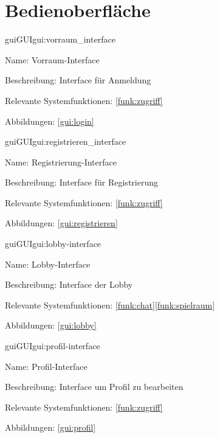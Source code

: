 
\section{Bedienoberfläche}

\setcounter{gui}{10}

\begin{description}[leftmargin=5em, style=sameline]	
	\begin{lhp}{gui}{GUI}{gui:vorraum_interface}
		\item[Name:] Vorraum-Interface
		\item[Beschreibung:] Interface für Anmeldung
		\item[Relevante Systemfunktionen:] \ref{funk:zugriff}
		\item[Abbildungen:] \ref{gui:login}
	\end{lhp}
\end{description}

\begin{description}[leftmargin=5em, style=sameline]	
	\begin{lhp}{gui}{GUI}{gui:registrieren_interface}
		\item[Name:] Registrierung-Interface
		\item[Beschreibung:] Interface für Registrierung
		\item[Relevante Systemfunktionen:] \ref{funk:zugriff}
		\item[Abbildungen:] \ref{gui:registrieren}
	\end{lhp}
\end{description}

\begin{description}[leftmargin=5em, style=sameline]	
	\begin{lhp}{gui}{GUI}{gui:lobby-interface}
		\item[Name:] Lobby-Interface
		\item[Beschreibung:] Interface der Lobby
		\item[Relevante Systemfunktionen:] \ref{funk:chat}\ref{funk:spielraum}
		\item[Abbildungen:] \ref{gui:lobby}
	\end{lhp}
\end{description}

\begin{description}[leftmargin=5em, style=sameline]	
	\begin{lhp}{gui}{GUI}{gui:profil-interface}
		\item[Name:] Profil-Interface
		\item[Beschreibung:] Interface um Profil zu bearbeiten
		\item[Relevante Systemfunktionen:] \ref{funk:zugriff}
		\item[Abbildungen:] \ref{gui:profil}
	\end{lhp}
\end{description}

